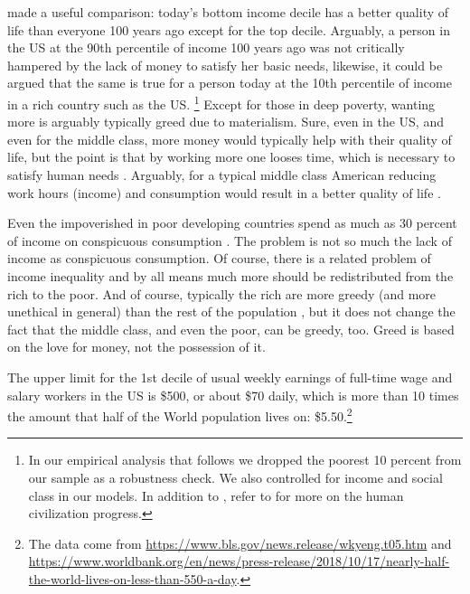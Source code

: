 \documentclass[10pt, letterpaper]{article}
\begin{document}
\begin{spacing}{1.8}
\citet{bok10} made a useful comparison: today's bottom income decile has a better quality of life than everyone 100 years ago except for the top decile. Arguably, a person in the US at the 90th percentile of income 100 years ago was not critically hampered by the lack of money to satisfy her basic needs, likewise, it could be argued that the same is true for a person today at the 10th percentile of income in a rich country such as the US. \footnote{In our empirical analysis that follows we dropped the poorest 10 percent from our sample as a robustness check. We also controlled for income and social class in our models. In addition to
  \citet{bok10}, refer to \citet[e.g.,][]{pinker18} for more on the human civilization progress.}
Except for those in deep poverty, wanting more is arguably typically greed due to materialism.
Sure, even in the US, and even for the middle class, more money would typically help
with their quality of life, but the point is that by working more one looses
time, which is necessary to satisfy human needs \citep{maslow87}.
 Arguably, for a typical middle class American reducing work hours (income) and
 consumption would result in a better quality of life \cite{dittmar14,kasser13,hsee13,leonard10}.

Even the impoverished in poor developing countries spend as much as 30 percent of income on conspicuous consumption \citep{banerjee11}. The problem is not so much the lack of income as conspicuous consumption. Of course, there is a related problem of income inequality and by all means much more should be redistributed from the rich to the poor. And of course, typically the rich are more greedy (and more unethical in general) than the rest of the population \cite{piff17,piff14,piff12,piff10,kraus09}, but it does
not change the fact that the middle class, and even the poor, can be greedy, too. Greed is based on the love for money, not the possession of it. 

The upper limit for the 1st decile of usual weekly earnings of full-time wage and salary workers in the US is \$500, or about \$70 daily, which is more than 10
times the amount that half of the World population lives on: \$5.50.\footnote{The data come from \url{https://www.bls.gov/news.release/wkyeng.t05.htm} and \url{https://www.worldbank.org/en/news/press-release/2018/10/17/nearly-half-the-world-lives-on-less-than-550-a-day}.}   


\end{spacing}
\end{document}
